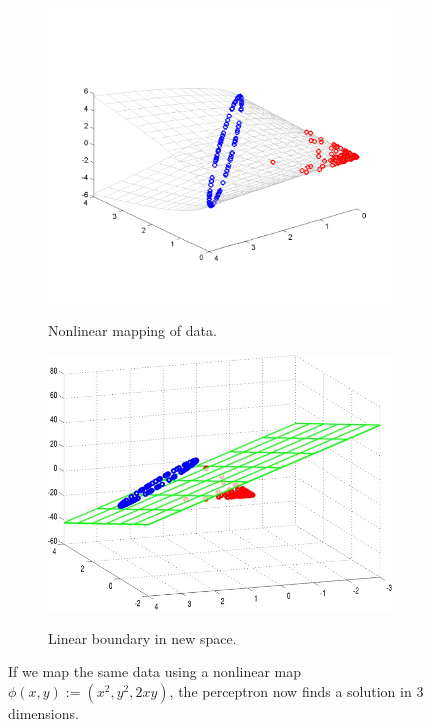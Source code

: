 \documentclass[letterpaper,12pt,peerreviewca,draftcls]{IEEEtran}
\begin{document}
\begin{figure}
\centering
	\begin{subfigure}[t]{0.45\textwidth}
		\includegraphics[width=\linewidth]{"Figure S5a.pdf"}
		\label{fig:fmapped_data}
		\caption{Nonlinear mapping of data.}
	\end{subfigure}
	\begin{subfigure}[t]{0.45\textwidth}
		\includegraphics[width=\linewidth]{"Figure S5b.jpg"}
		\label{fig:fmapped_bound}
		\caption{Linear boundary in new space.}
	\end{subfigure}
    \caption{If we map the same data using a nonlinear map $\phi(x,y):= (x^2, y^2, 2xy)$, the perceptron now finds a solution
             in 3 dimensions.}
    \label{fig:fmapped}
\end{figure} 
\end{document}
